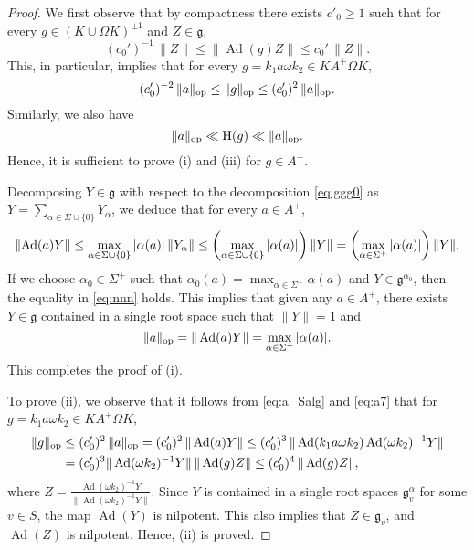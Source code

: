 \documentclass[11pt,reqno,a4paper]{amsart}
\numberwithin{equation}{section}
\newcommand{\gog}{\mathfrak{g}}
\DeclareMathOperator{\Ad}{Ad}
\theoremstyle{theorem}
\theoremstyle{definition}
\begin{document}
\begin{proof}
	We first observe that by compactness there exists $c'_0\ge 1$ such that
	for every $g\in (K\cup \Omega K)^{\pm 1}$ and $Z\in\gog$,
	$$
	(c_0')^{-1}\, \|Z\|\le \|\Ad(g)Z\|\le c_0'\, \|Z\|.
	$$
	This, in particular, implies that for every $g=k_1a\omega k_2\in KA^+\Omega K$,
	\begin{equation}
	\label{eq:a_Salg}
	(c'_0)^{-2}\, \|a\|_{\rm op} \le \|g\|_{\rm op}\le (c_0')^2\, \|a\|_{\rm op}.
	\end{equation}
	Similarly, we also have
	$$
	\|a\|_{\rm op} \ll \hbox{H}(g)\ll  \|a\|_{\rm op}.
	$$
	Hence, it is sufficient to prove (i) and (iii) for $g\in A^+$.
	
	Decomposing $Y\in \gog$ with respect to the decomposition \eqref{eq:ggg0}
	as $Y=\sum_{\alpha\in\Sigma\cup\{0\}} Y_\alpha$,
	we deduce that for every $a\in A^+$,
	\begin{equation}
	\label{eq:nnn}
	\|\hbox{Ad}(a)Y\|\le\max_{\alpha\in \Sigma\cup \{0\}} |\alpha(a)|\,\|Y_\alpha\|\le 
	\left(\max_{\alpha\in \Sigma\cup \{0\}} |\alpha(a)|\right) \|Y\|
	=\left(\max_{\alpha\in \Sigma^+} |\alpha(a)|\right) \|Y\|.
	\end{equation}
	If we choose $\alpha_0\in\Sigma^+$ such that $\alpha_0(a)=\max_{\alpha\in \Sigma^+} \alpha(a)$ and $Y\in \gog^{\alpha_0}$, then the equality in \eqref{eq:nnn} holds.
	This implies that given any $a\in A^+$, there exists $Y\in \gog$ 
	contained in a single root space such that
	$\|Y\|=1$ and
	\begin{equation}
	\label{eq:a7}
	\|a\|_{\rm op}=\|\Ad(a)Y\|=\max_{\alpha\in \Sigma^+} |\alpha(a)|.
	\end{equation}
	This completes the proof of (i).

	To prove (ii), we observe that it follows from \eqref{eq:a_Salg} and \eqref{eq:a7}
	that for $g=k_1a\omega k_2\in KA^+\Omega K$,
	\begin{align*}
	\|g\|_{\rm op}&\le (c_0')^2\, \|a\|_{\rm op}=(c_0')^2\, \|\Ad(a)Y\|\le (c_0')^3\, \|\Ad(k_1a\omega k_2) \Ad(\omega k_2)^{-1}Y\|\\
	&= (c_0')^3 \|\Ad(\omega k_2)^{-1}Y\|\, \|\Ad(g) Z\|\le (c_0')^4\, \|\Ad(g) Z\|,
	\end{align*}
	where $Z=\frac{\Ad(\omega k_2)^{-1}Y}{\|\Ad(\omega k_2)^{-1}Y\|}$.
	Since $Y$ is contained in a single root spaces $\gog^\alpha_v$ for some $v\in S$,
	the map $\Ad(Y)$ is nilpotent. This also implies that
	$Z\in \gog_v$, and $\Ad(Z)$ is nilpotent. Hence, (ii) is proved.
	

\end{proof}
\end{document}
